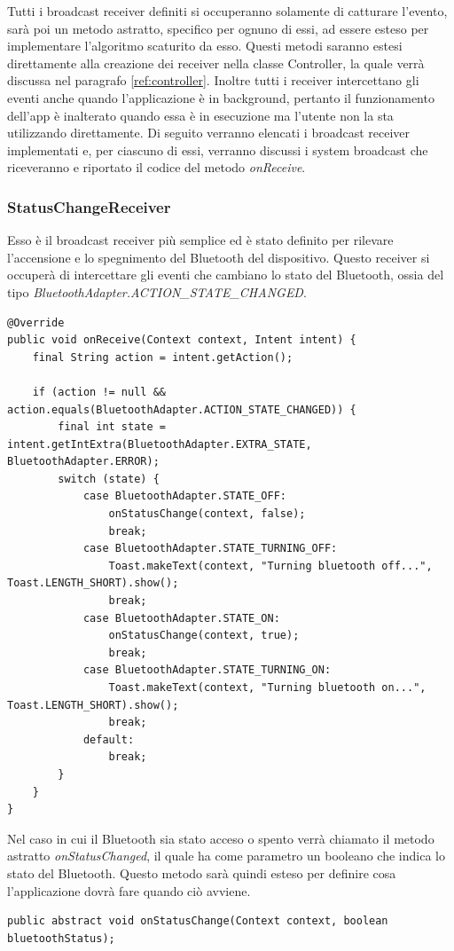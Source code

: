 Tutti i broadcast receiver definiti si occuperanno solamente di catturare l'evento, sarà poi un metodo astratto, specifico per ognuno di essi, ad essere esteso per implementare l'algoritmo scaturito da esso. Questi metodi saranno estesi direttamente alla creazione dei receiver nella classe Controller, la quale verrà discussa nel paragrafo \ref{ref:controller}. Inoltre tutti i receiver intercettano gli eventi anche quando l'applicazione è in background, pertanto il funzionamento dell'app è inalterato quando essa è in esecuzione ma l'utente non la sta utilizzando direttamente. Di seguito verranno elencati i broadcast receiver implementati e, per ciascuno di essi, verranno discussi i system broadcast che riceveranno e riportato il codice del metodo \textit{onReceive}.

\subsubsection{StatusChangeReceiver}
Esso è il broadcast receiver più semplice ed è stato definito per rilevare l'accensione e lo spegnimento del Bluetooth del dispositivo. Questo receiver si occuperà di intercettare gli eventi che cambiano lo stato del Bluetooth, ossia del tipo \textit{BluetoothAdapter.ACTION\_STATE\_CHANGED}.
\begin{verbatim}
@Override
public void onReceive(Context context, Intent intent) {
    final String action = intent.getAction();

    if (action != null && action.equals(BluetoothAdapter.ACTION_STATE_CHANGED)) {
        final int state = intent.getIntExtra(BluetoothAdapter.EXTRA_STATE, BluetoothAdapter.ERROR);
        switch (state) {
            case BluetoothAdapter.STATE_OFF:
                onStatusChange(context, false);
                break;
            case BluetoothAdapter.STATE_TURNING_OFF:
                Toast.makeText(context, "Turning bluetooth off...", Toast.LENGTH_SHORT).show();
                break;
            case BluetoothAdapter.STATE_ON:
                onStatusChange(context, true);
                break;
            case BluetoothAdapter.STATE_TURNING_ON:
                Toast.makeText(context, "Turning bluetooth on...", Toast.LENGTH_SHORT).show();
                break;
            default:
                break;
        }
    }
}
\end{verbatim}

Nel caso in cui il Bluetooth sia stato acceso o spento verrà chiamato il metodo astratto \textit{onStatusChanged}, il quale ha come parametro un booleano che indica lo stato del Bluetooth. Questo metodo sarà quindi esteso per definire cosa l'applicazione dovrà fare quando ciò avviene.
\begin{verbatim}
public abstract void onStatusChange(Context context, boolean bluetoothStatus);
\end{verbatim}

